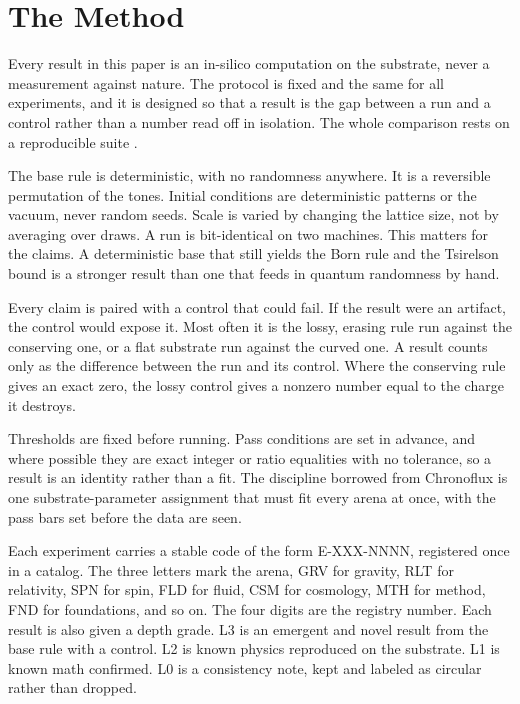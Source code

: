 \section{The Method}

Every result in this paper is an in-silico computation on the substrate, never a measurement against nature. The protocol is fixed and the same for all experiments, and it is designed so that a result is the gap between a run and a control rather than a number read off in isolation. The whole comparison rests on a reproducible suite \cite{cluesurf2026repo}.

The base rule is deterministic, with no randomness anywhere. It is a reversible permutation of the tones. Initial conditions are deterministic patterns or the vacuum, never random seeds. Scale is varied by changing the lattice size, not by averaging over draws. A run is bit-identical on two machines. This matters for the claims. A deterministic base that still yields the Born rule and the Tsirelson bound is a stronger result than one that feeds in quantum randomness by hand.

Every claim is paired with a control that could fail. If the result were an artifact, the control would expose it. Most often it is the lossy, erasing rule run against the conserving one, or a flat substrate run against the curved one. A result counts only as the difference between the run and its control. Where the conserving rule gives an exact zero, the lossy control gives a nonzero number equal to the charge it destroys.

Thresholds are fixed before running. Pass conditions are set in advance, and where possible they are exact integer or ratio equalities with no tolerance, so a result is an identity rather than a fit. The discipline borrowed from Chronoflux is one substrate-parameter assignment that must fit every arena at once, with the pass bars set before the data are seen.

Each experiment carries a stable code of the form E-XXX-NNNN, registered once in a catalog. The three letters mark the arena, GRV for gravity, RLT for relativity, SPN for spin, FLD for fluid, CSM for cosmology, MTH for method, FND for foundations, and so on. The four digits are the registry number. Each result is also given a depth grade. L3 is an emergent and novel result from the base rule with a control. L2 is known physics reproduced on the substrate. L1 is known math confirmed. L0 is a consistency note, kept and labeled as circular rather than dropped.

